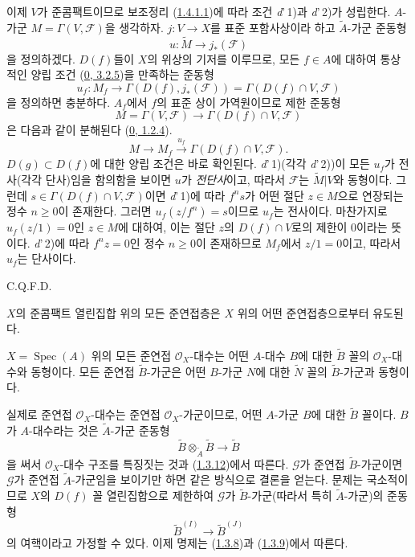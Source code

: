 이제 $V$가 준콤팩트이므로 보조정리
(\hyperref[I.1.4.1.1-ko]{1.4.1.1})에 따라 조건
\textit{d}'\,1)과 \textit{d}'\,2)가 성립한다. $A$-가군
$M=\Gamma(V,\mathscr{F})$을 생각하자. $j:V\to X$를 표준
포함사상이라 하고 $\widetilde{A}$-가군 준동형
\[
  u:\widetilde{M}\longrightarrow j_*(\mathscr{F})
\]
을 정의하겠다. $D(f)$들이 $X$의 위상의 기저를 이루므로, 모든
$f\in A$에 대하여 통상적인 양립 조건
(\hyperref[0.3.2.5-ko]{0, 3.2.5})을 만족하는 준동형
\[
  u_f:M_f\longrightarrow
  \Gamma(D(f),j_*(\mathscr{F}))
  =\Gamma(D(f)\cap V,\mathscr{F})
\]
을 정의하면 충분하다. $A_f$에서 $f$의 표준 상이 가역원이므로 제한
준동형
\[
  M=\Gamma(V,\mathscr{F})\longrightarrow
  \Gamma(D(f)\cap V,\mathscr{F})
\]
은 다음과 같이 분해된다
(\hyperref[0.1.2.4-ko]{0, 1.2.4}).
\[
  M\longrightarrow M_f\xrightarrow{u_f}
  \Gamma(D(f)\cap V,\mathscr{F}).
\]
$D(g)\subset D(f)$에 대한 양립 조건은 바로 확인된다.
\textit{d}'\,1)(각각 \textit{d}'\,2))이 모든 $u_f$가
전사(각각 단사)임을 함의함을 보이면 $u$가 \emph{전단사}이고,
따라서 $\mathscr{F}$는 $\widetilde{M}|V$와 동형이다. 그런데
$s\in\Gamma(D(f)\cap V,\mathscr{F})$이면 \textit{d}'\,1)에 따라
$f^n s$가 어떤 절단 $z\in M$으로 연장되는 정수 $n\geq0$이
존재한다. 그러면 $u_f(z/f^n)=s$이므로 $u_f$는 전사이다. 마찬가지로
$u_f(z/1)=0$인 $z\in M$에 대하여, 이는 절단 $z$의
$D(f)\cap V$로의 제한이 $0$이라는 뜻이다. \textit{d}'\,2)에 따라
$f^n z=0$인 정수 $n\geq0$이 존재하므로 $M_f$에서 $z/1=0$이고,
따라서 $u_f$는 단사이다.

\par\hfill C.Q.F.D.\par

\begin{corollary}[1.4.2]
\label{I.1.4.2-ko}
$X$의 준콤팩트 열린집합 위의 모든 준연접층은 $X$ 위의 어떤
준연접층으로부터 유도된다.
\end{corollary}

\begin{corollary}[1.4.3]
\label{I.1.4.3-ko}
$X=\operatorname{Spec}(A)$ 위의 모든 준연접
$\mathscr{O}_X$-대수는 어떤 $A$-대수 $B$에 대한
$\widetilde{B}$ 꼴의 $\mathscr{O}_X$-대수와 동형이다. 모든 준연접
$\widetilde{B}$-가군은 어떤 $B$-가군 $N$에 대한
$\widetilde{N}$ 꼴의 $\widetilde{B}$-가군과 동형이다.
\end{corollary}

실제로 준연접 $\mathscr{O}_X$-대수는 준연접
$\mathscr{O}_X$-가군이므로, 어떤 $A$-가군 $B$에 대한
$\widetilde{B}$ 꼴이다. $B$가 $A$-대수라는 것은
$\widetilde{A}$-가군 준동형
\[
  \widetilde{B}\otimes_{\widetilde{A}}\widetilde{B}
  \longrightarrow\widetilde{B}
\]
을 써서 $\mathscr{O}_X$-대수 구조를 특징짓는 것과
(\hyperref[I.1.3.12-ko]{1.3.12})에서 따른다. $\mathscr{G}$가 준연접
$\widetilde{B}$-가군이면 $\mathscr{G}$가 준연접
$\widetilde{A}$-가군임을 보이기만 하면 같은 방식으로 결론을 얻는다.
문제는 국소적이므로 $X$의 $D(f)$ 꼴 열린집합으로 제한하여
$\mathscr{G}$가 $\widetilde{B}$-가군(따라서 특히
$\widetilde{A}$-가군)의 준동형
\[
  \widetilde{B}^{(I)}\longrightarrow\widetilde{B}^{(J)}
\]
의 여핵이라고 가정할 수 있다. 이제 명제는
(\hyperref[I.1.3.8-ko]{1.3.8})과
(\hyperref[I.1.3.9-ko]{1.3.9})에서 따른다.

